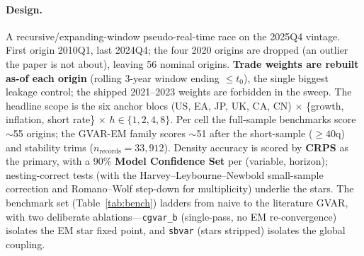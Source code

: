 \documentclass[11pt]{article}
\begin{document}
\paragraph{Design.} A recursive/expanding-window pseudo-real-time race on the 2025Q4 vintage. First
origin 2010Q1, last 2024Q4; the four 2020 origins are dropped (an outlier the paper is not about),
leaving 56 nominal origins. \textbf{Trade weights are rebuilt as-of each origin} (rolling
3-year window ending $\le t_0$), the single biggest leakage control; the shipped 2021--2023 weights are
forbidden in the sweep. The headline scope is the six anchor blocs (US, EA, JP, UK, CA, CN) $\times$
\{growth, inflation, short rate\} $\times$ $h\in\{1,2,4,8\}$. Per cell the full-sample benchmarks score
$\sim$55 origins; the GVAR-EM family scores $\sim$51 after the short-sample ($\ge40$q) and stability
trims ($n_{\text{records}}=33{,}912$). Density accuracy is scored by \textbf{CRPS}
\citep{GneitingRaftery2007} as the primary, with a 90\% \textbf{Model Confidence Set}
\citep{HansenLundeNason2011} per (variable, horizon); nesting-correct tests
\citep{GiacominiWhite2006,ClarkWest2007,DieboldMariano1995} (with the Harvey--Leybourne--Newbold
small-sample correction \citep{HarveyLeybourneNewbold1997} and Romano--Wolf step-down
\citep{RomanoWolf2005} for multiplicity) underlie the stars. The benchmark set
(Table~\ref{tab:bench}) ladders from naive to the literature GVAR, with two deliberate
ablations---\texttt{cgvar\_b} (single-pass, no EM re-convergence) isolates the EM star fixed point, and
\texttt{sbvar} (stars stripped) isolates the global coupling.
\end{document}
